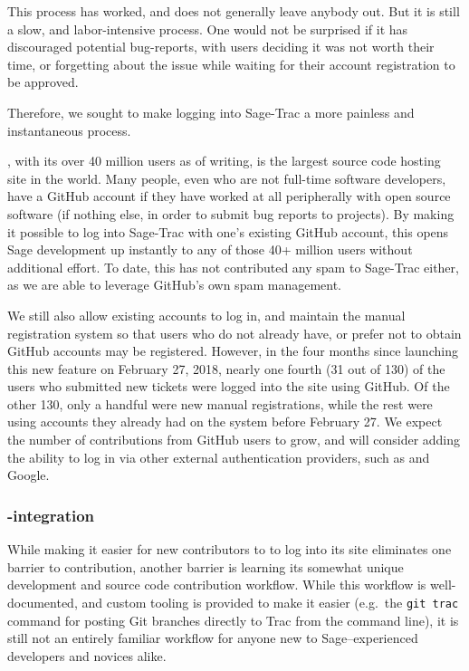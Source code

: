 This process has worked, and does not generally leave anybody out.  But it is
still a slow, and labor-intensive process.  One would not be surprised if it
has discouraged potential bug-reports, with users deciding it was not worth
their time, or forgetting about the issue while waiting for their account
registration to be approved.

Therefore, we sought to make logging into Sage-Trac a more painless and
instantaneous process.

\GitHub, with its over 40 million users as of writing, is the largest source
code hosting site in the world.  Many people, even who are not full-time
software developers, have a GitHub account if they have worked at all
peripherally with open source software (if nothing else, in order to submit bug
reports to projects).  By making it possible to log into Sage-Trac with one's
existing GitHub account, this opens Sage development up instantly to any of
those 40+ million users without additional effort.  To date, this has not
contributed any spam to Sage-Trac either, as we are able to leverage GitHub's
own spam management.

We still also allow existing accounts to log in, and maintain the manual
registration system so that users who do not already have, or prefer not to
obtain GitHub accounts may be registered.  However, in the four months since
launching this new feature on February 27, 2018, nearly one fourth (31 out of
130) of the users who submitted new tickets were logged into the site using
GitHub.  Of the other 130, only a handful were new manual registrations, while
the rest were using accounts they already had on the system before February 27.
We expect the number of contributions from GitHub users to grow, and will
consider adding the ability to log in via other external authentication
providers, such as \GitLab and Google.


\hypertarget{gitlab-trac-integration}{%
\subsubsection{\GitLab-\Trac integration}\label{gitlab-trac-integration}}

While making it easier for new contributors to \Sage to log into its \Trac site
eliminates one barrier to contribution, another barrier is learning its
somewhat unique development and source code contribution workflow.  While this
workflow is well-documented, and custom tooling is provided to make it easier
(e.g.~the {\tt git trac} command for posting Git branches directly to Trac
from the command line), it is still not an entirely familiar workflow for
anyone new to Sage--experienced developers and novices alike.


